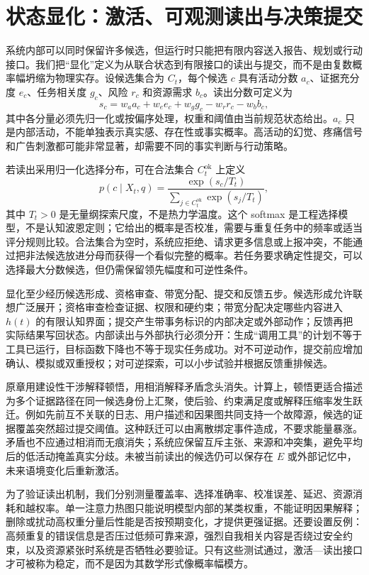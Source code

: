 \section{状态显化：激活、可观测读出与决策提交}
\label{sec:manifestation_born_rule}

系统内部可以同时保留许多候选，但运行时只能把有限内容送入报告、规划或行动接口。我们把“显化”定义为从联合状态到有限接口的读出与提交，而不是由复数概率幅坍缩为物理实存。设候选集合为 $C_t$，每个候选 $c$ 具有活动分数 $a_c$、证据充分度 $e_c$、任务相关度 $g_c$、风险 $r_c$ 和资源需求 $b_c$。读出分数可定义为
\begin{equation}
 s_c=w_a a_c+w_e e_c+w_g g_c-w_r r_c-w_b b_c,
\end{equation}
其中各分量必须先归一化或按偏序处理，权重和阈值由当前规范状态给出。$a_c$ 只是内部活动，不能单独表示真实感、存在性或事实概率。高活动的幻觉、疼痛信号和广告刺激都可能非常显著，却需要不同的事实判断与行动策略。

若读出采用归一化选择分布，可在合法集合 $C_t^{\mathrm{ok}}$ 上定义
\begin{equation}
 p(c\mid X_t,q)=\frac{\exp(s_c/T_t)}{\sum_{j\in C_t^{\mathrm{ok}}}\exp(s_j/T_t)},
\end{equation}
其中 $T_t>0$ 是无量纲探索尺度，不是热力学温度。这个 softmax 是工程选择模型，不是认知波恩定则；它给出的概率是否校准，需要与重复任务中的频率或适当评分规则比较。合法集合为空时，系统应拒绝、请求更多信息或上报冲突，不能通过把非法候选放进分母而获得一个看似完整的概率。若任务要求确定性提交，可以选择最大分数候选，但仍需保留领先幅度和可逆性条件。

显化至少经历候选形成、资格审查、带宽分配、提交和反馈五步。候选形成允许联想广泛展开；资格审查检查证据、权限和硬约束；带宽分配决定哪些内容进入 $h(t)$ 的有限认知界面；提交产生带事务标识的内部决定或外部动作；反馈再把实际结果写回状态。内部读出与外部执行必须分开：生成“调用工具”的计划不等于工具已运行，目标函数下降也不等于现实任务成功。对不可逆动作，提交前应增加确认、模拟或双重授权；对可逆探索，可以小步试验并根据反馈重排候选。

原章用建设性干涉解释顿悟，用相消解释矛盾念头消失。计算上，顿悟更适合描述为多个证据路径在同一候选身份上汇聚，使后验、约束满足度或解释压缩率发生跃迁。例如先前互不关联的日志、用户描述和因果图共同支持一个故障源，候选的证据覆盖突然超过提交阈值。这种跃迁可以由离散绑定事件造成，不要求能量暴涨。矛盾也不应通过相消而无痕消失；系统应保留互斥主张、来源和冲突集，避免平均后的低活动掩盖真实分歧。未被当前读出的候选仍可以保存在 $E$ 或外部记忆中，未来语境变化后重新激活。

为了验证读出机制，我们分别测量覆盖率、选择准确率、校准误差、延迟、资源消耗和越权率。单一注意力热图只能说明模型内部的某类权重，不能证明因果解释；删除或扰动高权重分量后性能是否按预期变化，才提供更强证据。还要设置反例：高频重复的错误信息是否压过低频可靠来源，强烈自我相关内容是否绕过安全约束，以及资源紧张时系统是否牺牲必要验证。只有这些测试通过，激活—读出接口才可被称为稳定，而不是因为其数学形式像概率幅模方。

